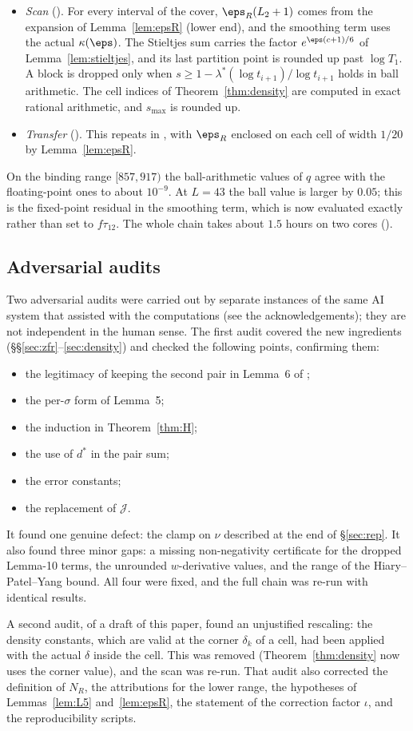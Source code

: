 \begin{itemize}
\item \emph{Scan} (). For every interval of the cover, $\eps_R(L_2+1)$ comes from the expansion of Lemma~\ref{lem:epsR} (lower end), and the smoothing term uses the actual $\kappa(\eps)$.
  The Stieltjes sum carries the factor $e^{\eps(c+1)/6}$ of Lemma~\ref{lem:stieltjes}, and its last partition point is rounded up past $\log T_1$.
  A block is dropped only when $s \ge 1 - \lambda^*(\log t_{i+1})/\log t_{i+1}$ holds in ball arithmetic.
  The cell indices of Theorem~\ref{thm:density} are computed in exact rational arithmetic, and $s_{\max}$ is rounded up.
\item \emph{Transfer} (). This repeats  in , with $\eps_R$ enclosed on each cell of width $1/20$ by Lemma~\ref{lem:epsR}.
\end{itemize}
On the binding range $[857,917)$ the ball-arithmetic values of $q$ agree with the floating-point ones to about $10^{-9}$.
At $L = 43$ the ball value is larger by $0.05$; this is the fixed-point residual in the smoothing term, which is now evaluated exactly rather than set to $f\tau_{12}$.
The whole chain takes about $1.5$ hours on two cores ().

\subsection{Adversarial audits}
Two adversarial audits were carried out by separate instances of the same AI system that assisted with the computations (see the acknowledgements); they are not independent in the human sense.
The first audit covered the new ingredients (\S\S\ref{sec:zfr}--\ref{sec:density}) and checked the following points, confirming them:
\begin{itemize}
\item the legitimacy of keeping the second pair in Lemma~6 of \cite{BTY};
\item the per-$\sigma$ form of Lemma~5;
\item the induction in Theorem~\ref{thm:H};
\item the use of $d^*$ in the pair sum;
\item the error constants;
\item the replacement of $\mathcal J$.
\end{itemize}
It found one genuine defect: the clamp on $\nu$ described at the end of \S\ref{sec:rep}.
It also found three minor gaps: a missing non-negativity certificate for the dropped Lemma-10 terms, the unrounded $w$-derivative values, and the range of the Hiary--Patel--Yang bound.
All four were fixed, and the full chain was re-run with identical results.

A second audit, of a draft of this paper, found an unjustified rescaling: the density constants, which are valid at the corner $\delta_k$ of a cell, had been applied with the actual $\delta$ inside the cell.
This was removed (Theorem~\ref{thm:density} now uses the corner value), and the scan was re-run.
That audit also corrected the definition of $N_R$, the attributions for the lower range, the hypotheses of Lemmas~\ref{lem:L5} and~\ref{lem:epsR}, the statement of the correction factor $\iota$, and the reproducibility scripts.
